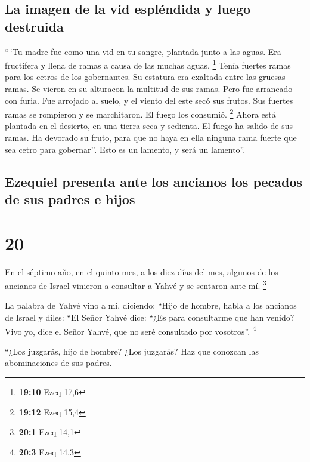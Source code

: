 \hypertarget{la-imagen-de-la-vid-espluxe9ndida-y-luego-destruida}{%
\subsection{La imagen de la vid espléndida y luego
destruida}\label{la-imagen-de-la-vid-espluxe9ndida-y-luego-destruida}}

 ``\,`Tu madre fue como una vid en tu sangre, plantada
junto a las aguas. Era fructífera y llena de ramas a causa de las muchas
aguas. \footnote{\textbf{19:10} Ezeq 17,6}  Tenía fuertes
ramas para los cetros de los gobernantes. Su estatura era exaltada entre
las gruesas ramas. Se vieron en su alturacon la multitud de sus ramas.
 Pero fue arrancado con furia. Fue arrojado al suelo, y
el viento del este secó sus frutos. Sus fuertes ramas se rompieron y se
marchitaron. El fuego los consumió. \footnote{\textbf{19:12} Ezeq 15,4}
 Ahora está plantada en el desierto, en una tierra seca y
sedienta.  El fuego ha salido de sus ramas. Ha devorado
su fruto, para que no haya en ella ninguna rama fuerte que sea cetro
para gobernar''. Esto es un lamento, y será un lamento''.

\hypertarget{ezequiel-presenta-ante-los-ancianos-los-pecados-de-sus-padres-e-hijos}{%
\subsection{Ezequiel presenta ante los ancianos los pecados de sus
padres e
hijos}\label{ezequiel-presenta-ante-los-ancianos-los-pecados-de-sus-padres-e-hijos}}

\hypertarget{section-19}{%
\section{20}\label{section-19}}

 En el séptimo año, en el quinto mes, a los diez días del
mes, algunos de los ancianos de Israel vinieron a consultar a Yahvé y se
sentaron ante mí. \footnote{\textbf{20:1} Ezeq 14,1}

 La palabra de Yahvé vino a mí, diciendo: 
``Hijo de hombre, habla a los ancianos de Israel y diles: ``El Señor
Yahvé dice: ``¿Es para consultarme que han venido? Vivo yo, dice el
Señor Yahvé, que no seré consultado por vosotros''. \footnote{\textbf{20:3}
  Ezeq 14,3}

 ``¿Los juzgarás, hijo de hombre? ¿Los juzgarás? Haz que
conozcan las abominaciones de sus padres.

